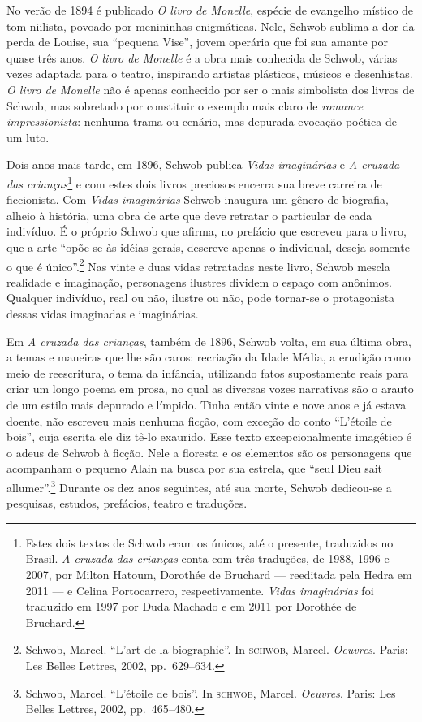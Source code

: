 No verão de 1894 é publicado \textit{O livro de Monelle},
espécie de evangelho místico de tom niilista, povoado por menininhas
enigmáticas. Nele, Schwob sublima a dor da perda de Louise, sua
“pequena Vise”, jovem operária que foi sua amante por quase três anos.
\textit{O livro de Monelle} é a obra mais conhecida de Schwob, várias vezes
adaptada para o teatro, inspirando artistas plásticos, músicos e desenhistas.
\textit{O livro de Monelle} não é apenas conhecido por ser o mais simbolista
dos livros de Schwob, mas sobretudo por constituir o exemplo mais claro de
\textit{romance impressionista}: nenhuma trama ou cenário, mas depurada
evocação poética de um luto.

Dois anos mais tarde, em 1896, Schwob publica \textit{Vidas imaginárias} e
\textit{A cruzada das crianças}\footnote{ Estes dois textos de Schwob eram os
únicos, até o presente, traduzidos no Brasil. \textit{A cruzada das crianças}
conta com três traduções, de 1988, 1996 e 2007, por Milton Hatoum, Dorothée de
Bruchard --- reeditada pela Hedra em 2011 --- e Celina Portocarrero, respectivamente. \textit{Vidas imaginárias} foi
traduzido em 1997 por Duda Machado e em 2011 por Dorothée de Bruchard.} e com estes dois livros preciosos
encerra sua breve carreira de ficcionista. Com \textit{Vidas imaginárias} Schwob
inaugura um gênero de biografia, alheio à história, uma obra de
arte que deve retratar o particular de cada indivíduo. É o próprio Schwob que
afirma, no prefácio que escreveu para o livro, que a arte “opõe-se às idéias
gerais, descreve apenas o individual, deseja somente o que é único”.\footnote{ Schwob, Marcel. 
``L’art de la biographie''. In \textsc{schwob}, Marcel. \textit{Oeuvres}.
Paris: Les Belles Lettres, 2002, pp.~629--634.} Nas vinte e duas vidas
retratadas neste livro, Schwob mescla realidade e imaginação, personagens
ilustres dividem o espaço com anônimos. Qualquer indivíduo, real ou não,
ilustre ou não, pode tornar-se o protagonista dessas vidas imaginadas e imaginárias.

Em \textit{A cruzada das crianças}, também de 1896,
Schwob volta, em sua última obra, a temas e maneiras que lhe são caros:
recriação da Idade Média, a erudição como meio de reescritura, o tema da
infância, utilizando fatos supostamente reais para criar um longo poema em
prosa, no qual as diversas vozes narrativas são o arauto de um estilo mais
depurado e límpido. Tinha então vinte e nove anos e já estava doente, não
escreveu mais nenhuma ficção, com exceção do conto “L'étoile de bois”, cuja
escrita ele diz tê-lo exaurido. Esse texto excepcionalmente imagético é o adeus de Schwob
à ficção. Nele a floresta e
os elementos são os personagens que acompanham o pequeno Alain na busca por sua
estrela, que “seul Dieu sait allumer”.\footnote{ Schwob, Marcel. ``L’étoile de
bois''. In \textsc{schwob}, Marcel. \textit{Oeuvres}. Paris: Les Belles Lettres, 2002, pp.~465--480.}
Durante os dez anos seguintes, até sua morte, Schwob dedicou-se a
pesquisas, estudos, prefácios, teatro e traduções.

